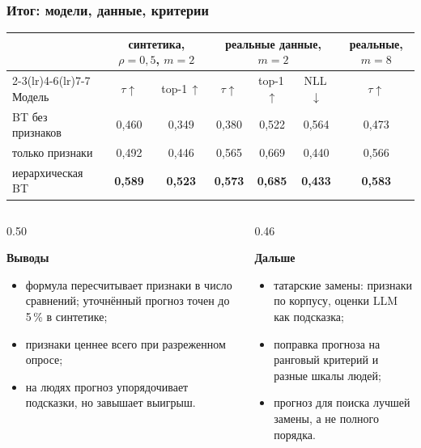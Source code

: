\documentclass[aspectratio=169,10pt]{beamer}
\newcommand{\head}[1]{{\fontsize{9}{10.5}\selectfont\color{accent}\bfseries #1}\par\vspace{0.6mm}}
\newcommand{\txt}{\fontsize{8.5}{10.2}\selectfont}
\newcommand{\key}[1]{{\color{accent}\bfseries #1}}
\begin{document}
\begin{frame}[t]
\frametitle{Итог: модели, данные, критерии}
\vspace{1mm}
{\txt\centering
\begin{tabular}{l cc ccc c}
\toprule
& \multicolumn{2}{c}{синтетика, $\rho=0{,}5$, $m=2$} & \multicolumn{3}{c}{реальные данные, $m=2$} & реальные, $m=8$ \\
\cmidrule(lr){2-3}\cmidrule(lr){4-6}\cmidrule(lr){7-7}
Модель & $\tau\uparrow$ & top-1\,$\uparrow$ & $\tau\uparrow$ & top-1\,$\uparrow$ & NLL\,$\downarrow$ & $\tau\uparrow$ \\
\midrule
BT без признаков & 0,460 & 0,349 & 0,380 & 0,522 & 0,564 & 0,473 \\
только признаки & 0,492 & 0,446 & 0,565 & 0,669 & 0,440 & 0,566 \\
иерархическая BT & \key{0,589} & \key{0,523} & \key{0,573} & \key{0,685} & \key{0,433} & \key{0,583} \\
\bottomrule
\end{tabular}\par}
\vspace{4mm}
\begin{columns}[T,onlytextwidth]
\begin{column}{0.50\textwidth}\txt\raggedright
\head{Выводы}
\begin{itemize}\setlength{\itemsep}{0.6mm}
\item формула пересчитывает признаки в число сравнений; уточнённый прогноз точен до 5\,\% в синтетике;
\item признаки ценнее всего при разреженном опросе;
\item на людях прогноз упорядочивает подсказки, но завышает выигрыш.
\end{itemize}
\end{column}
\begin{column}{0.46\textwidth}\txt\raggedright
\head{Дальше}
\begin{itemize}\setlength{\itemsep}{0.6mm}
\item татарские замены: признаки по корпусу, оценки LLM как подсказка;
\item поправка прогноза на ранговый критерий и разные шкалы людей;
\item прогноз для поиска лучшей замены, а не полного порядка.
\end{itemize}
\end{column}
\end{columns}
\end{frame}
\end{document}

